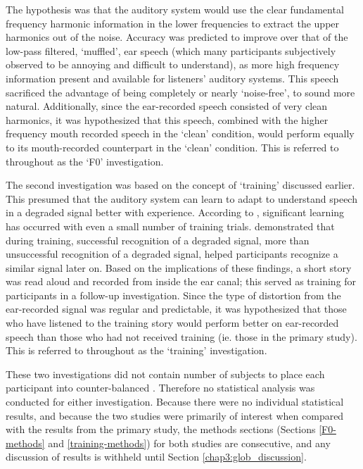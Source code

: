 The hypothesis was that the auditory system would use the clear fundamental frequency harmonic information in the lower frequencies to extract the upper harmonics out of the noise.  Accuracy was predicted to improve over that of the low-pass filtered, `muffled', ear speech (which many participants subjectively observed to be annoying and difficult to understand), as more high frequency information \DIFdelbegin {}\DIFdelend \DIFaddbegin {}\DIFaddend present and available for listeners' auditory systems.  This speech sacrificed the advantage of being completely or nearly `noise-free', to sound more natural.  Additionally, since the ear-recorded speech consisted of very clean harmonics, it was hypothesized that this speech, combined with the higher frequency mouth recorded speech in the `clean' condition, would perform equally to its mouth-recorded counterpart in the `clean' condition. This is referred to throughout as the `F0' investigation.

The second investigation was based on the concept of `training' discussed earlier.  This presumed that the auditory system can learn to adapt to understand speech in a degraded signal better with experience.  According to \cite{mattys:12}, significant learning has occurred with even a small number of training trials.  \cite{davis:05} demonstrated that during training, successful recognition of a degraded signal, more than unsuccessful recognition of a degraded signal, helped participants recognize a similar signal later on.  
Based on the implications of these findings, a short story was read aloud and recorded from inside the ear canal; this served as training for participants in a follow-up investigation.  Since the type of distortion from the ear-recorded signal was regular and predictable, it was hypothesized that those who have listened to the training story would perform better on ear-recorded speech than those who had not received training (ie. those in the primary study). This is referred to throughout as the `training' investigation.

These two investigations \DIFaddbegin {}\DIFaddend did not contain \DIFdelbegin {}\DIFdelend \DIFaddbegin {}\DIFaddend number of subjects \DIFaddbegin {}\DIFaddend to place each participant into \DIFdelbegin {}\DIFdelend \DIFaddbegin {}\DIFaddend counter-balanced \DIFdelbegin {}\DIFdelend \DIFaddbegin {}\DIFaddend .  Therefore no statistical analysis was conducted for either investigation.  %
Because there were no individual statistical results, and because the two studies were primarily of interest when compared with the results from the primary study, the methods sections (Sections \ref{F0-methods} and \ref{training-methods}) for both studies are consecutive, and any discussion of results is withheld until Section \ref{chap3:glob_discussion}.

